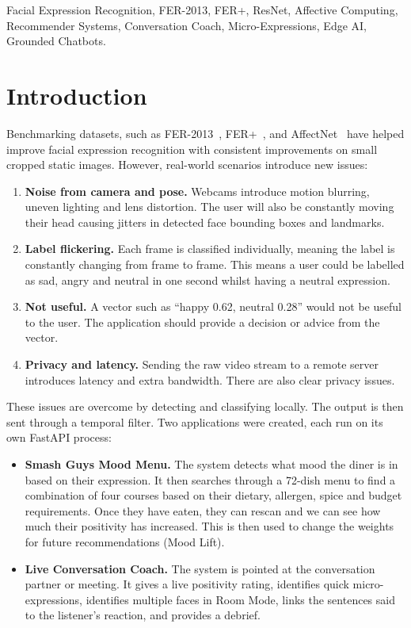 \documentclass[conference]{IEEEtran}
\begin{document}
\begin{IEEEkeywords}
Facial Expression Recognition, FER-2013, FER+, ResNet, Affective Computing, Recommender Systems, Conversation Coach, Micro-Expressions, Edge AI, Grounded Chatbots.
\end{IEEEkeywords}

\section{Introduction}
Benchmarking datasets, such as FER-2013~\cite{goodfellow}, FER+~\cite{barsoum}, and AffectNet~\cite{mollahosseini} have helped improve facial expression recognition with consistent improvements on small cropped static images. However, real-world scenarios introduce new issues:
\begin{enumerate}
    \item \textbf{Noise from camera and pose.} Webcams introduce motion blurring, uneven lighting and lens distortion. The user will also be constantly moving their head causing jitters in detected face bounding boxes and landmarks.
    \item \textbf{Label flickering.} Each frame is classified individually, meaning the label is constantly changing from frame to frame. This means a user could be labelled as sad, angry and neutral in one second whilst having a neutral expression.
    \item \textbf{Not useful.} A vector such as ``happy 0.62, neutral 0.28'' would not be useful to the user. The application should provide a decision or advice from the vector.
    \item \textbf{Privacy and latency.} Sending the raw video stream to a remote server introduces latency and extra bandwidth. There are also clear privacy issues.
\end{enumerate}

These issues are overcome by detecting and classifying locally. The output is then sent through a temporal filter. Two applications were created, each run on its own FastAPI process:
\begin{itemize}
    \item \textbf{Smash Guys Mood Menu.} The system detects what mood the diner is in based on their expression. It then searches through a 72-dish menu to find a combination of four courses based on their dietary, allergen, spice and budget requirements. Once they have eaten, they can rescan and we can see how much their positivity has increased. This is then used to change the weights for future recommendations (Mood Lift).
    \item \textbf{Live Conversation Coach.} The system is pointed at the conversation partner or meeting. It gives a live positivity rating, identifies quick micro-expressions, identifies multiple faces in Room Mode, links the sentences said to the listener's reaction, and provides a debrief.
\end{itemize}
\end{document}
